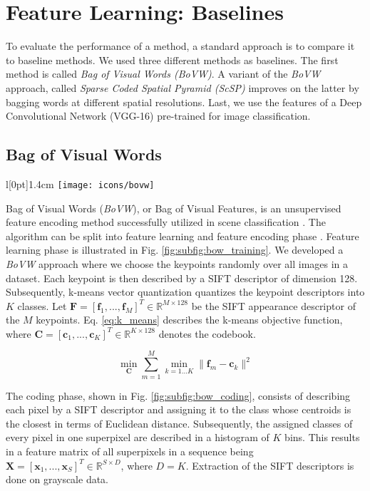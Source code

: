 \section{Feature Learning: Baselines} \label{ch:baselines}
To evaluate the performance of a method, a standard approach is to compare it to baseline methods.
We used three different methods as baselines.
The first method is called \textit{Bag of Visual Words (BoVW)}.
A variant of the \textit{BoVW} approach, called \textit{Sparse Coded Spatial Pyramid (ScSP)} improves on the latter by bagging words at different spatial resolutions.
Last, we use the features of a Deep Convolutional Network (VGG-16) pre-trained for image classification.

\subsection{Bag of Visual Words} \label{bow}
\begingroup
\setlength\intextsep{0pt}
\begin{wrapfigure}[4]{l}[0pt]{1.4cm}
\texttt{[image: icons/bovw]}
\end{wrapfigure}

Bag of Visual Words (\textit{BoVW}), or Bag of Visual Features, is an unsupervised feature encoding method successfully utilized in scene classification \cite{zhang15}.
The algorithm can be split into feature learning and feature encoding phase \cite{cheriyadat14}. Feature learning phase is illustrated in Fig. \ref{fig:subfig:bow_training}. We developed a \textit{BoVW} approach where we choose the keypoints randomly over all images in a dataset. Each keypoint is then described by a SIFT descriptor of dimension 128. Subsequently, k-means vector quantization quantizes the keypoint descriptors into $K$ classes. Let $\boldsymbol{F} = [\boldsymbol{f}_1,...,\boldsymbol{f}_M]^T \in \mathbb{R}^{M \times 128}$ be the SIFT appearance descriptor of the $M$ keypoints. Eq. \ref{eq:k_means} describes the k-means objective function, where $\boldsymbol{C} = [\boldsymbol{c}_1,...,\boldsymbol{c}_K]^T \in \mathbb{R}^{K \times 128}$ denotes the codebook.

\endgroup

\begin{equation}
   \min_{\boldsymbol{C}} \sum_{m=1}^M \min_{k=1...K} \|\boldsymbol{f}_m - \boldsymbol{c}_k\|^2
   \label{eq:k_means} 
\end{equation}
\vspace{6pt}

The coding phase, shown in Fig. \ref{fig:subfig:bow_coding}, consists of describing each pixel by a SIFT descriptor and assigning it to the class whose centroids is the closest in terms of Euclidean distance. Subsequently, the assigned classes of every pixel in one superpixel are described in a histogram of $K$ bins. This results in a feature matrix of all superpixels in a sequence being $\boldsymbol{X} = [\boldsymbol{x}_1,...,\boldsymbol{x}_S]^T \in \mathbb{R}^{S \times D}$, where $D = K$. Extraction of the SIFT descriptors is done on grayscale data.

